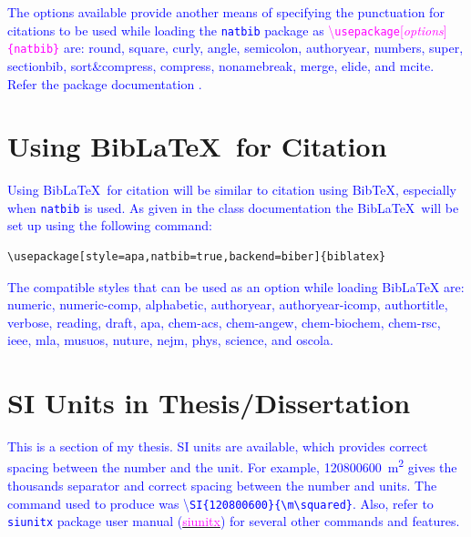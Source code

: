 \documentclass[phd]{ndsu-thesis-2022}
\newcommand\italk[1]{\textcolor{blue}{#1}}  %
\newcommand\cmd[1]{\textbackslash\texttt{#1}}  %
\newcommand\vb[1]{\textcolor{blue}{\texttt{#1}}}%
\begin{document}
\italk{
The options available provide another means of specifying the punctuation
for citations to be used while loading the \texttt{natbib} package as \textcolor{magenta}{\cmd{usepackage}[\emph{options}]\texttt{\{natbib\}}} are: \textbullet\:round, \textbullet\:square, \textbullet\:curly, \textbullet\:angle, \textbullet\:semicolon, \textbullet\:authoryear, \textbullet\:numbers, \textbullet\:super, \textbullet\:sectionbib, \textbullet\:sort\&compress, \textbullet\:compress, \textbullet\:nonamebreak, \textbullet\:merge, \textbullet\:elide, and \textbullet\:mcite. Refer the package documentation \citep{daly2010natural}.  
}

\section{Using Bib\LaTeX\ for Citation}
\italk{Using Bib\LaTeX\ for citation will be similar to citation using BibTeX, especially when \vb{natbib} is used. As given in the class documentation the Bib\LaTeX\ will be set up using the following command:
}

\vspace{2ex}
{\singlespacing
\begin{verbatim}
\usepackage[style=apa,natbib=true,backend=biber]{biblatex}
\end{verbatim}
}

\italk{The compatible styles that can be used as an option while loading Bib\LaTeX\/ are: \textbullet\:numeric, \textbullet\:numeric-comp, \textbullet\:alphabetic, \textbullet\:authoryear, \textbullet\:authoryear-icomp, \textbullet\:authortitle, \textbullet\:verbose, \textbullet\:reading, \textbullet\:draft, \textbullet\:apa, \textbullet\:chem-acs, \textbullet\:chem-angew, \textbullet\:chem-biochem, \textbullet\:chem-rsc, \textbullet\:ieee, \textbullet\:mla, \textbullet\:musuos, \textbullet\:nuture, \textbullet\:nejm, \textbullet\:phys, \textbullet\:science, and \textbullet\:oscola.}



\section{SI Units in Thesis/Dissertation}
\italk{This is a section of my thesis. SI units are available, which provides correct spacing between the number and the unit. For example, \qty{120800600}{\m\squared} gives the thousands separator and correct spacing between the number and units. The command used to produce was \textbackslash\texttt{SI\{120800600\}\{\textbackslash m\textbackslash squared\}}.  Also, refer to \texttt{siunitx} package user manual (\href{https://mirror.mwt.me/ctan/macros/latex/contrib/siunitx/siunitx.pdf}{\textcolor{magenta}{siunitx}}) for several other commands and features.} 
\end{document}
